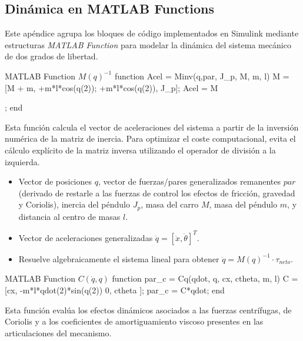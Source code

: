 \documentclass[11pt,fleqn]{book} %
\begin{document}
\subsection{Dinámica en MATLAB Functions}
\label{ap:codigo_dinamica}

Este apéndice agrupa los bloques de código implementados en Simulink mediante estructuras \textit{MATLAB Function} para modelar la dinámica del sistema mecánico de dos grados de libertad.

\begin{matlabbox}{MATLAB Function $M(q)^{-1}$}
	function Acel = Minv(q,par, J_p, M, m, l)
		M = [M + m,          +m*l*cos(q(2));
		     +m*l*cos(q(2)),      J_p];
		Acel = M\par; %
	end
\end{matlabbox}
Esta función calcula el vector de aceleraciones del sistema a partir de la inversión numérica de la matriz de inercia. Para optimizar el coste computacional, evita el cálculo explícito de la matriz inversa utilizando el operador de división a la izquierda.

\begin{itemize}[leftmargin=1.5cm]
	\item[\textbf{Entradas:}] Vector de posiciones $q$, vector de fuerzas/pares generalizados remanentes $par$ (derivado de restarle a las fuerzas de control los efectos de fricción, gravedad y Coriolis), inercia del péndulo $J_p$, masa del carro $M$, masa del péndulo $m$, y distancia al centro de masas $l$.
	\item[\textbf{Salidas:}] Vector de aceleraciones generalizadas $\ddot{q} = [\ddot{x}, \ddot{\theta}]^T$.
	\item[\textbf{Operación:}] Resuelve algebraicamente el sistema lineal para obtener $\ddot{q} = M(q)^{-1} \cdot \tau_{neto}$.
\end{itemize}




\begin{matlabbox}{{MATLAB Function $C(\dot{q}, q)$}}
	function par_c = Cq(qdot, q, cx, ctheta, m, l)
		C = [cx,   -m*l*qdot(2)*sin(q(2))
		      0,          ctheta        ];
		par_c = C*qdot;
	end
\end{matlabbox}
Esta función evalúa los efectos dinámicos asociados a las fuerzas centrífugas, de Coriolis y a los coeficientes de amortiguamiento viscoso presentes en las articulaciones del mecanismo.
\end{document}
